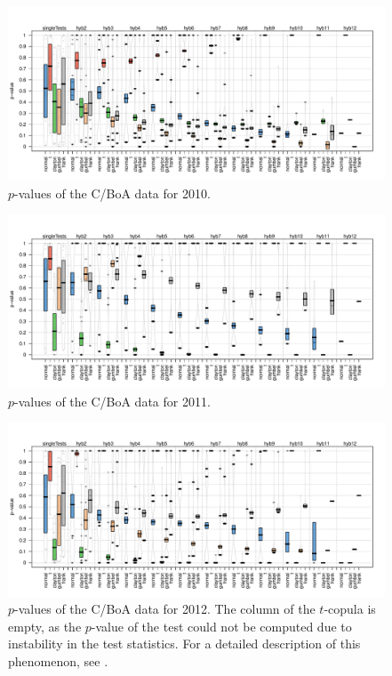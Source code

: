 \begin{appendices}
\begin{figure}[H]
	\centering
 \includegraphics[width=\textwidth]{img/C_BoA_10.pdf}
	\caption{$p$-values of the C/BoA data for 2010.}
	\label{Pirateplot_C_BoA_10}
\end{figure}
\begin{figure}[H]
	\centering
 \includegraphics[width=\textwidth]{img/C_BoA_11.pdf}
	\caption{$p$-values of the C/BoA data for 2011.}
	\label{Pirateplot_C_BoA_11}
\end{figure}

\begin{figure}[H]
	\centering
 \includegraphics[width=\textwidth]{img/C_BoA_12.pdf}
	\caption{$p$-values of the C/BoA data for 2012. The column \mycolor \protect{} \bk of the $t$-copula is empty, as the $p$-value of the test \protect{} could not be computed due to instability in the test statistics. For a detailed description of this phenomenon, see \citet{schepsmeier2018package}.}
	\label{Pirateplot_C_BoA_12}
\end{figure}
\end{appendices}

